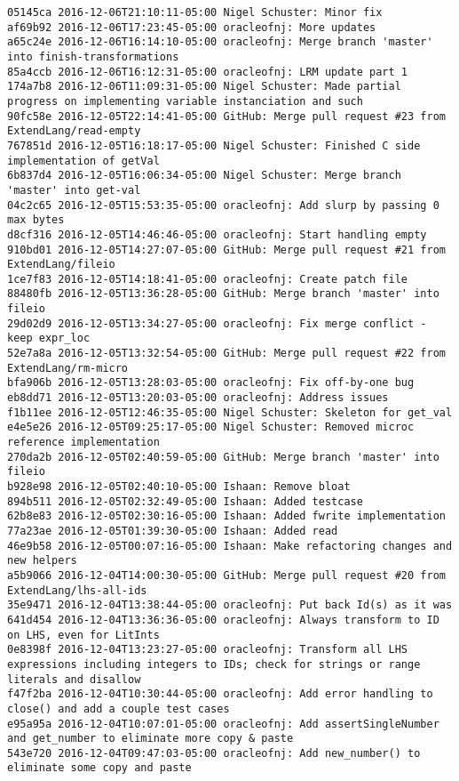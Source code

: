 \begin{lstlisting}
05145ca 2016-12-06T21:10:11-05:00 Nigel Schuster: Minor fix
af69b92 2016-12-06T17:23:45-05:00 oracleofnj: More updates
a65c24e 2016-12-06T16:14:10-05:00 oracleofnj: Merge branch 'master' into finish-transformations
85a4ccb 2016-12-06T16:12:31-05:00 oracleofnj: LRM update part 1
174a7b8 2016-12-06T11:09:31-05:00 Nigel Schuster: Made partial progress on implementing variable instanciation and such
90fc58e 2016-12-05T22:14:41-05:00 GitHub: Merge pull request #23 from ExtendLang/read-empty
767851d 2016-12-05T16:18:17-05:00 Nigel Schuster: Finished C side implementation of getVal
6b837d4 2016-12-05T16:06:34-05:00 Nigel Schuster: Merge branch 'master' into get-val
04c2c65 2016-12-05T15:53:35-05:00 oracleofnj: Add slurp by passing 0 max bytes
d8cf316 2016-12-05T14:46:46-05:00 oracleofnj: Start handling empty
910bd01 2016-12-05T14:27:07-05:00 GitHub: Merge pull request #21 from ExtendLang/fileio
1ce7f83 2016-12-05T14:18:41-05:00 oracleofnj: Create patch file
88480fb 2016-12-05T13:36:28-05:00 GitHub: Merge branch 'master' into fileio
29d02d9 2016-12-05T13:34:27-05:00 oracleofnj: Fix merge conflict - keep expr_loc
52e7a8a 2016-12-05T13:32:54-05:00 GitHub: Merge pull request #22 from ExtendLang/rm-micro
bfa906b 2016-12-05T13:28:03-05:00 oracleofnj: Fix off-by-one bug
eb8dd71 2016-12-05T13:20:03-05:00 oracleofnj: Address issues
f1b11ee 2016-12-05T12:46:35-05:00 Nigel Schuster: Skeleton for get_val
e4e5e26 2016-12-05T09:25:17-05:00 Nigel Schuster: Removed microc reference implementation
270da2b 2016-12-05T02:40:59-05:00 GitHub: Merge branch 'master' into fileio
b928e98 2016-12-05T02:40:10-05:00 Ishaan: Remove bloat
894b511 2016-12-05T02:32:49-05:00 Ishaan: Added testcase
62b8e83 2016-12-05T02:30:16-05:00 Ishaan: Added fwrite implementation
77a23ae 2016-12-05T01:39:30-05:00 Ishaan: Added read
46e9b58 2016-12-05T00:07:16-05:00 Ishaan: Make refactoring changes and new helpers
a5b9066 2016-12-04T14:00:30-05:00 GitHub: Merge pull request #20 from ExtendLang/lhs-all-ids
35e9471 2016-12-04T13:38:44-05:00 oracleofnj: Put back Id(s) as it was
641d454 2016-12-04T13:36:36-05:00 oracleofnj: Always transform to ID on LHS, even for LitInts
0e8398f 2016-12-04T13:23:27-05:00 oracleofnj: Transform all LHS expressions including integers to IDs; check for strings or range literals and disallow
f47f2ba 2016-12-04T10:30:44-05:00 oracleofnj: Add error handling to close() and add a couple test cases
e95a95a 2016-12-04T10:07:01-05:00 oracleofnj: Add assertSingleNumber and get_number to eliminate more copy & paste
543e720 2016-12-04T09:47:03-05:00 oracleofnj: Add new_number() to eliminate some copy and paste

\end{lstlisting}
